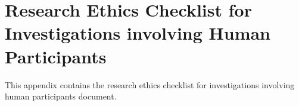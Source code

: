 %
%
%                 

\chapter{Research Ethics Checklist for Investigations involving Human Participants}
\label{sec:appendixg}

This appendix contains the  research ethics checklist for investigations involving human participants document.



